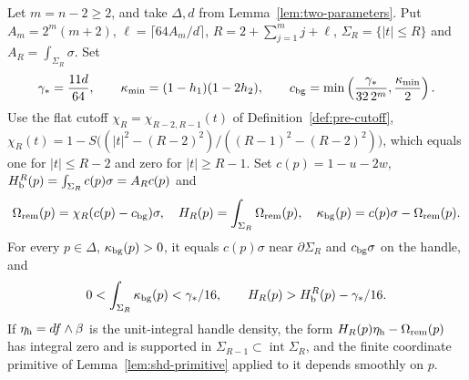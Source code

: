 \begin{proposition}\label{prop:two-affine-budget}
Let $m=n-2\ge2$, and take $\Delta,d$ from Lemma~\ref{lem:two-parameters}.
Put $A_m=2^m(m+2)$, $\ell=\lceil64A_m/d\rceil$,
$R=2+\sum_{j=1}^m j+\ell$, $\Sigma_R=\{|t|\le R\}$ and $A_R=\int_{\Sigma_R}\sigma$. Set
\[
 \gamma_*=\frac{11d}{64},\qquad
 \kappa_{\min}=(1-h_1)(1-2h_2),\qquad
 c_{\rm bg}=\min\left(\frac{\gamma_*}{32\,2^m},\frac{\kappa_{\min}}2\right).
\]
Use the flat cutoff $\chi_R=\chi_{R-2,R-1}(t)$ of Definition~\ref{def:pre-cutoff},
$\chi_R(t)=1-S\bigl((|t|^2-(R-2)^2)/((R-1)^2-(R-2)^2)\bigr)$, which equals one for $|t|\le R-2$ and zero for $|t|\ge R-1$.
Set $c(p)=1-u-2w$, $H_{\mathrm b}^R(p)=\int_{\Sigma_R}c(p)\sigma=A_Rc(p)$ and
\[
 \Omega_{\rm rem}(p)=\chi_R(c(p)-c_{\rm bg})\sigma,\quad
 H_R(p)=\int_{\Sigma_R}\Omega_{\rm rem}(p),\quad
 \kappa_{\rm bg}(p)=c(p)\sigma-\Omega_{\rm rem}(p).
\]
For every $p\in\Delta$, $\kappa_{\rm bg}(p)>0$, it equals $c(p)\sigma$ near $\partial\Sigma_R$ and
$c_{\rm bg}\sigma$ on the handle, and
\[
 0<\int_{\Sigma_R}\kappa_{\rm bg}(p)<\gamma_*/16,\qquad
 H_R(p)>H_{\mathrm b}^R(p)-\gamma_*/16.
\]
If $\eta_{\rm h}=df\wedge\beta$ is the unit-integral handle density, the form $H_R(p)\eta_{\rm h}-\Omega_{\rm rem}(p)$ has integral
zero and is supported in $\Sigma_{R-1}\subset\operatorname{int}\Sigma_R$, and the finite coordinate primitive of
Lemma~\ref{lem:shd-primitive} applied to it depends smoothly on $p$.
\end{proposition}

